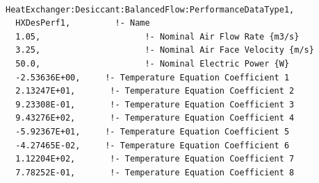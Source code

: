 \begin{lstlisting}

HeatExchanger:Desiccant:BalancedFlow:PerformanceDataType1,
  HXDesPerf1,         !- Name
  1.05,                     !- Nominal Air Flow Rate {m3/s}
  3.25,                     !- Nominal Air Face Velocity {m/s}
  50.0,                     !- Nominal Electric Power {W}
  -2.53636E+00,     !- Temperature Equation Coefficient 1
  2.13247E+01,       !- Temperature Equation Coefficient 2
  9.23308E-01,       !- Temperature Equation Coefficient 3
  9.43276E+02,       !- Temperature Equation Coefficient 4
  -5.92367E+01,     !- Temperature Equation Coefficient 5
  -4.27465E-02,     !- Temperature Equation Coefficient 6
  1.12204E+02,       !- Temperature Equation Coefficient 7
  7.78252E-01,       !- Temperature Equation Coefficient 8



\end{lstlisting}
